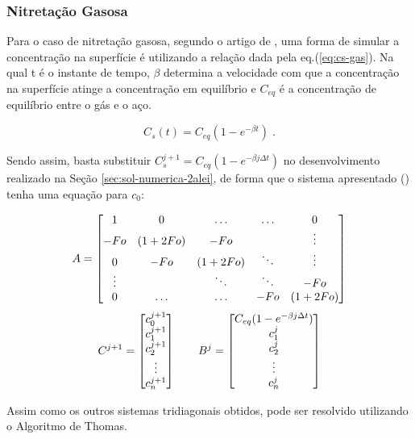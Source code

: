 \subsubsection{Nitretação Gasosa}
\label{sec:nit-gas}
Para o caso de nitretação gasosa, segundo o artigo de \cite{christiansen2008nitrogen}, uma forma de simular a concentração na superfície é utilizando a relação dada pela eq.(\ref{eq:cs-gas}). Na qual t é o instante de tempo, $\beta$ determina a velocidade com que a concentração na superfície atinge a concentração em equilíbrio e $C_{eq}$ é a concentração de equilíbrio entre o gás e o aço.

\begin{equation}
\label{eq:cs-gas}
C_{s}(t) = C_{eq}(1 - e^{-\beta t}) \;.
\end{equation}

Sendo assim, basta substituir $C_s^{j+1} = C_{eq}(1 - e^{-\beta j\Delta t})$ no desenvolvimento realizado na Seção \autoref{sec:sol-numerica-2alei}, de forma que o sistema apresentado () tenha uma equação para $c_0$:

\begin{equation*}
	\cmrtext{A} =
	\begin{bmatrix}
		  1 & 0   &  \ldots    & \ldots & 0\\
		-Fo & (1+2Fo) &  -Fo   &        & \vdots\\
		 0  & -Fo &   (1+2Fo)   & \ddots & \vdots\\
	 \vdots &     &  \ddots & \ddots & -Fo \\
	     0  & \ldots & \ldots &  -Fo   & (1+2Fo) 
	\end{bmatrix}
\end{equation*}
\begin{equation*}
	\cmrtext{C^{j+1}} =
	\begin{bmatrix}
		c_0^{j+1} \\
		c_1^{j+1} \\
		c_2^{j+1} \\
		\vdots \\
		c_n^{j+1}
	\end{bmatrix}
	\qquad
	\cmrtext{B^j} =	
	\begin{bmatrix}
		C_{eq}(1 - e^{-\beta j\Delta t}) \\
		c_1^j \\
		c_2^{j} \\
		\vdots \\
		c_n^{j}
	\end{bmatrix}
\end{equation*}

Assim como os outros sistemas tridiagonais obtidos, pode ser resolvido utilizando o Algoritmo de Thomas.